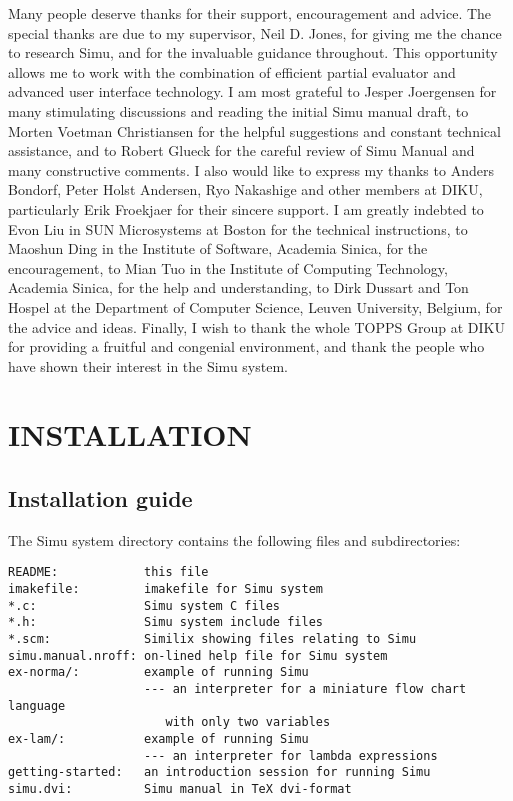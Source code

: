 \begin{sloppypar}
\medskip
\par
\medskip
\par

   Many people deserve thanks for their support, encouragement and
advice. The special thanks are due to my supervisor, Neil D. Jones,
for giving me the chance to research Simu, and for the invaluable
guidance throughout. This opportunity allows me to work with the
combination of efficient partial evaluator and advanced user interface
technology. I am most grateful to Jesper Joergensen for many
stimulating discussions and reading the initial Simu manual draft, to
Morten Voetman Christiansen for the helpful suggestions and constant
technical assistance, and to Robert Glueck for the careful review of
Simu Manual and many constructive comments. I also would like to
express my thanks to Anders Bondorf, Peter Holst Andersen, Ryo
Nakashige and other members at DIKU, particularly Erik Froekjaer for
their sincere support. I am greatly indebted to Evon Liu in SUN
Microsystems at Boston for the technical instructions, to Maoshun Ding
in the Institute of Software, Academia Sinica, for the encouragement,
to Mian Tuo in the Institute of Computing Technology, Academia Sinica,
for the help and understanding, to Dirk Dussart and Ton Hospel at the
Department of Computer Science, Leuven University, Belgium, for the
advice and ideas. Finally, I wish to thank the whole TOPPS Group at
DIKU for providing a fruitful and congenial environment, and thank the
people who have shown their interest in the Simu system.


\pagebreak


\section{INSTALLATION}


\subsection{Installation guide}

The Simu system directory contains the following files and subdirectories:

\begin{verbatim}
README:            this file
imakefile:         imakefile for Simu system
*.c:               Simu system C files
*.h:               Simu system include files
*.scm:             Similix showing files relating to Simu
simu.manual.nroff: on-lined help file for Simu system
ex-norma/:         example of running Simu
                   --- an interpreter for a miniature flow chart language
                      with only two variables
ex-lam/:           example of running Simu
                   --- an interpreter for lambda expressions
getting-started:   an introduction session for running Simu
simu.dvi:          Simu manual in TeX dvi-format
\end{verbatim}



\end{sloppypar}
